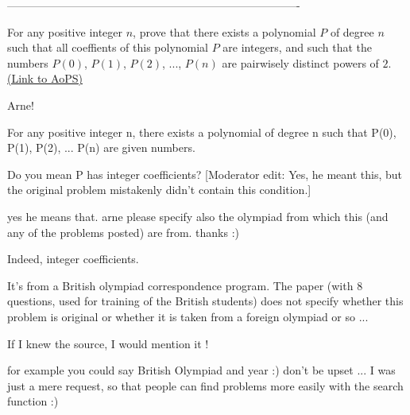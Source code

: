 -------------------------------------------------------------------------------

\begin{problem}
	For any positive integer $ n$, prove that there exists a polynomial $ P$ of degree $ n$ such that all coeffients of this polynomial $ P$ are integers, and such that the numbers $ P\left(0\right)$, $ P\left(1\right)$, $ P\left(2\right)$, ..., $ P\left(n\right)$ are pairwisely distinct powers of $ 2$.
	\flushright \href{https://artofproblemsolving.com/community/c6h1366}{(Link to AoPS)}
\end{problem}



\begin{solution}
	Arne!

For any positive integer n, there exists a polynomial of degree n such that P(0), P(1), P(2), ... P(n) are given numbers.

Do you mean P has integer coefficients?
[Moderator edit: Yes, he meant this, but the original problem mistakenly didn't contain this condition.]
\end{solution}



\begin{solution}
	yes he means that. arne please specify also the olympiad from which this (and any of the problems posted) are from. thanks :)
\end{solution}



\begin{solution}
	Indeed, integer coefficients.

It's from a British olympiad correspondence program. The paper (with 8 questions, used for training of the British students) does not specify whether this problem is original or whether it is taken from a foreign olympiad or so ...

If I knew the source, I would mention it !
\end{solution}



\begin{solution}
	for example you could say British Olympiad and year  :)  don't be upset ... I was just a mere request, so that people can find problems more easily with the search function :)
\end{solution}



